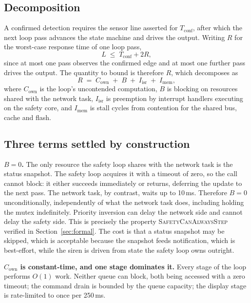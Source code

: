 \subsection{Decomposition}

A confirmed detection requires the sensor line asserted for $T_{\mathrm{conf}}$, after which the
next loop pass advances the state machine and drives the output. Writing $R$ for the worst-case
response time of one loop pass,
\begin{equation}
L \;\le\; T_{\mathrm{conf}} + 2R,
\label{eq:Lbound}
\end{equation}
since at most one pass observes the confirmed edge and at most one further pass drives the
output. The quantity to bound is therefore $R$, which decomposes as
\begin{equation}
R \;=\; C_{\mathrm{own}} \;+\; B \;+\; I_{\mathrm{isr}} \;+\; I_{\mathrm{mem}},
\label{eq:decomp}
\end{equation}
where $C_{\mathrm{own}}$ is the loop's uncontended computation, $B$ is blocking on resources
shared with the network task, $I_{\mathrm{isr}}$ is preemption by interrupt handlers executing on
the safety core, and $I_{\mathrm{mem}}$ is stall cycles from contention for the shared bus,
cache and flash.

\subsection{Three terms settled by construction}

\textbf{$B = 0$.} The only resource the safety loop shares with the network task is the status
snapshot. The safety loop acquires it with a timeout of zero, so the call cannot block: it either
succeeds immediately or returns, deferring the update to the next pass. The network task, by
contrast, waits up to 10\,ms. Therefore $B = 0$ unconditionally, independently of what the
network task does, including holding the mutex indefinitely. Priority inversion can delay the
network side and cannot delay the safety side. This is precisely the property
\textsc{SafetyCanAlwaysStep} verified in Section~\ref{sec:formal}. The cost is that a status
snapshot may be skipped, which is acceptable because the snapshot feeds notification, which is
best-effort, while the siren is driven from state the safety loop owns outright.

\textbf{$C_{\mathrm{own}}$ is constant-time, and one stage dominates it.} Every stage of the loop
performs $O(1)$ work. Neither queue can block, both being accessed with a zero timeout; the command
drain is bounded by the queue capacity; the display stage is rate-limited to once per 250\,ms.

